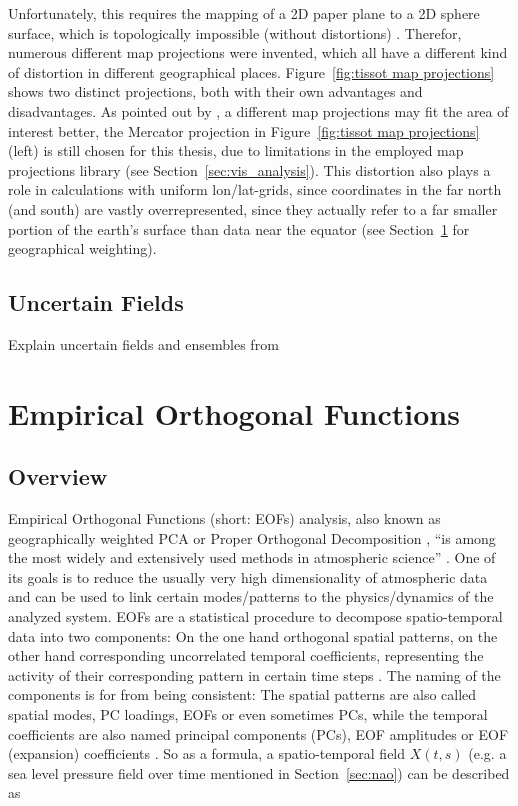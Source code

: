 Unfortunately, this requires the mapping of a 2D paper plane to a 2D sphere surface, which is topologically impossible (without distortions) \cite{vietinghoffdiss}.
Therefor, numerous different map projections were invented, which all have a different kind of distortion in different geographical places. 
Figure~\ref{fig:tissot map projections} shows two distinct projections, both with their own advantages and disadvantages. 
As pointed out by , a different map projections may fit the area of interest better, the Mercator projection in Figure~\ref{fig:tissot map projections} (left) is still chosen for this thesis, due to limitations in the employed map projections library (see Section~\ref{sec:vis_analysis}). 
This distortion also plays a role in calculations with uniform lon/lat-grids, since coordinates in the far north (and south) are vastly overrepresented, since they actually refer to a far smaller portion of the earth's surface than data near the equator (see Section~\ref{sec:eof} for geographical weighting). 


\subsection{Uncertain Fields}

Explain uncertain fields and ensembles from \cite{vietinghoffdiss, pothkow2015modeling}


\section{Empirical Orthogonal Functions}
\label{sec:eof}


\subsection{Overview}

Empirical Orthogonal Functions (short: EOFs) analysis, also known as geographically weighted PCA or Proper Orthogonal Decomposition \cite{vietinghoffdiss}, \enquote{is among the most widely and extensively used methods in atmospheric science} \cite{hannachi_empirical_2007}. 
One of its goals is to reduce the usually very high dimensionality of atmospheric data and can be used to link certain modes/patterns to the physics/dynamics of the analyzed system.  
EOFs are a statistical procedure to decompose spatio-temporal data into two components: On the one hand orthogonal spatial patterns, on the other hand corresponding uncorrelated temporal coefficients, representing the activity of their corresponding pattern in certain time steps \cite{hannachi_empirical_2007, vietinghoffdiss}. 
The naming of the components is for from being consistent: The spatial patterns are also called spatial modes, PC loadings, EOFs or even sometimes PCs, while the temporal coefficients are also named principal components (PCs), EOF amplitudes or EOF (expansion) coefficients \cite{hannachi_empirical_2007}. 
So as a formula, a spatio-temporal field $X(t, s)$ (e.g. a sea level pressure field over time mentioned in Section~\ref{sec:nao}) can be described as

